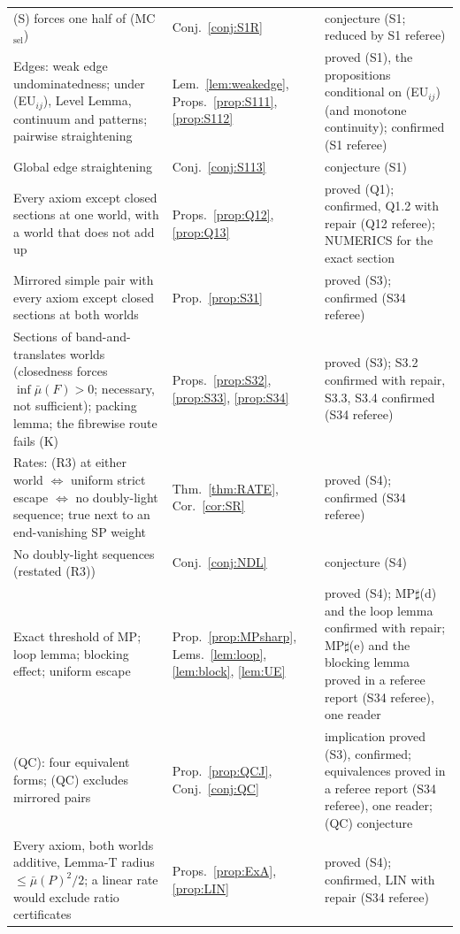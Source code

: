 \documentclass[11pt]{article}
\theoremstyle{definition}
\theoremstyle{remark}
\begin{document}
{\begin{longtable}{>{\raggedright\arraybackslash}p{6.4cm}>{\raggedright\arraybackslash}p{2.1cm}>{\raggedright\arraybackslash}p{5.6cm}}
(S) forces one half of (MC$_{\mathrm{sel}}$) & Conj.~\ref{conj:S1R} & conjecture (S1; reduced by S1 referee)\\
Edges: weak edge undominatedness; under (EU$_{ij}$), Level Lemma, continuum and patterns; pairwise straightening & Lem.~\ref{lem:weakedge}, Props.~\ref{prop:S111}, \ref{prop:S112} & proved (S1), the propositions conditional on (EU$_{ij}$) (and monotone continuity); confirmed (S1 referee)\\
Global edge straightening & Conj.~\ref{conj:S113} & conjecture (S1)\\
Every axiom except closed sections at one world, with a world that does not add up & Props.~\ref{prop:Q12}, \ref{prop:Q13} & proved (Q1); confirmed, Q1.2 with repair (Q12 referee); NUMERICS for the exact section\\
Mirrored simple pair with every axiom except closed sections at both worlds & Prop.~\ref{prop:S31} & proved (S3); confirmed (S34 referee)\\
Sections of band-and-translates worlds (closedness forces $\inf\bar\mu(F)>0$; necessary, not sufficient); packing lemma; the fibrewise route fails (K) & Props.~\ref{prop:S32}, \ref{prop:S33}, \ref{prop:S34} & proved (S3); S3.2 confirmed with repair, S3.3, S3.4 confirmed (S34 referee)\\
Rates: (R3) at either world $\iff$ uniform strict escape $\iff$ no doubly-light sequence; true next to an end-vanishing SP weight & Thm.~\ref{thm:RATE}, Cor.~\ref{cor:SR} & proved (S4); confirmed (S34 referee)\\
No doubly-light sequences (restated (R3)) & Conj.~\ref{conj:NDL} & conjecture (S4)\\
Exact threshold of MP; loop lemma; blocking effect; uniform escape & Prop.~\ref{prop:MPsharp}, Lems.~\ref{lem:loop}, \ref{lem:block}, \ref{lem:UE} & proved (S4); MP$\sharp$(d) and the loop lemma confirmed with repair; MP$\sharp$(e) and the blocking lemma proved in a referee report (S34 referee), one reader\\
(QC): four equivalent forms; (QC) excludes mirrored pairs & Prop.~\ref{prop:QCJ}, Conj.~\ref{conj:QC} & implication proved (S3), confirmed; equivalences proved in a referee report (S34 referee), one reader; (QC) conjecture\\
Every axiom, both worlds additive, Lemma-T radius $\le\bar\mu(P)^2/2$; a linear rate would exclude ratio certificates & Props.~\ref{prop:ExA}, \ref{prop:LIN} & proved (S4); confirmed, LIN with repair (S34 referee)\\

\end{longtable}}
\end{document}

